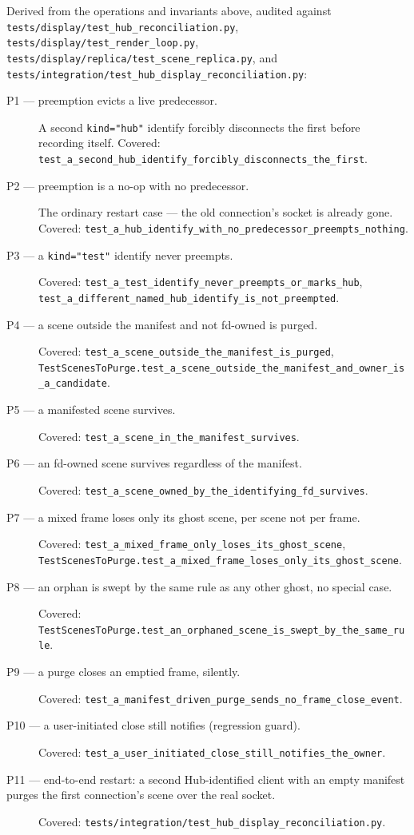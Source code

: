 \documentclass[a4paper,10pt,fleqn]{article}
\begin{document}
Derived from the operations and invariants above, audited against
\texttt{tests/display/test\_hub\_reconciliation.py},
\texttt{tests/display/test\_render\_loop.py},
\texttt{tests/display/replica/test\_scene\_replica.py}, and
\texttt{tests/integration/test\_hub\_display\_reconciliation.py}:

\begin{description}
  \item[P1 --- preemption evicts a live predecessor.] A second
    \texttt{kind="hub"} identify forcibly disconnects the first before
    recording itself.  Covered:
    \texttt{test\_a\_second\_hub\_identify\_forcibly\_disconnects\_the\_first}.
  \item[P2 --- preemption is a no-op with no predecessor.] The ordinary
    restart case --- the old connection's socket is already gone.
    Covered: \texttt{test\_a\_hub\_identify\_with\_no\_predecessor\_preempts\_nothing}.
  \item[P3 --- a \texttt{kind="test"} identify never preempts.] Covered:
    \texttt{test\_a\_test\_identify\_never\_preempts\_or\_marks\_hub},
    \texttt{test\_a\_different\_named\_hub\_identify\_is\_not\_preempted}.
  \item[P4 --- a scene outside the manifest and not fd-owned is purged.]
    Covered: \texttt{test\_a\_scene\_outside\_the\_manifest\_is\_purged},
    \texttt{TestScenesToPurge.test\_a\_scene\_outside\_the\_manifest\_and\_owner\_is\_a\_candidate}.
  \item[P5 --- a manifested scene survives.] Covered:
    \texttt{test\_a\_scene\_in\_the\_manifest\_survives}.
  \item[P6 --- an fd-owned scene survives regardless of the manifest.]
    Covered: \texttt{test\_a\_scene\_owned\_by\_the\_identifying\_fd\_survives}.
  \item[P7 --- a mixed frame loses only its ghost scene, per scene not
    per frame.] Covered:
    \texttt{test\_a\_mixed\_frame\_only\_loses\_its\_ghost\_scene},
    \texttt{TestScenesToPurge.test\_a\_mixed\_frame\_loses\_only\_its\_ghost\_scene}.
  \item[P8 --- an orphan is swept by the same rule as any other ghost, no
    special case.] Covered:
    \texttt{TestScenesToPurge.test\_an\_orphaned\_scene\_is\_swept\_by\_the\_same\_rule}.
  \item[P9 --- a purge closes an emptied frame, silently.] Covered:
    \texttt{test\_a\_manifest\_driven\_purge\_sends\_no\_frame\_close\_event}.
  \item[P10 --- a user-initiated close still notifies (regression guard).]
    Covered: \texttt{test\_a\_user\_initiated\_close\_still\_notifies\_the\_owner}.
  \item[P11 --- end-to-end restart: a second Hub-identified client with an
    empty manifest purges the first connection's scene over the real
    socket.] Covered:
    \texttt{tests/integration/test\_hub\_display\_reconciliation.py}.
\end{description}
\end{document}

